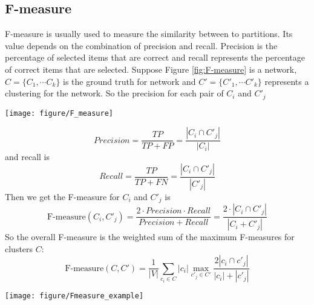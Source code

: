 \documentclass[12pt,oneside,final]{vlsithesis}
\begin{document}
\subsection{F-measure}
F-measure \cite{wagner2007comparing} is usually used to measure the similarity between to partitions. Its value depends on the combination of precision and recall. Precision is the percentage of selected items that are correct and recall represents the percentage of correct items that are selected. Suppose Figure \ref{fig:F-measure} is a network, $C = \{C_{1}, \cdots C_{k}\}$ is the ground truth for network and $C' = \{C'_{1}, \cdots C'_{k}\}$ represents a clustering for the network. So the precision for each pair of $C_{i}$ and $C'_{j}$ 
\begin{figure*}
	\centering
	\texttt{[image: figure/F\_measure]}
	\caption{F-measure}
	\label{fig:F-measure}
\end{figure*}
\begin{equation}
	Precision = \frac{TP}{TP + FP} = \frac{|C_{i} \cap C'_{j}|}{|C_{i}|}
\end{equation}
and recall is 
\begin{equation}
	Recall = \frac{TP}{TP + FN} = \frac{|C_{i} \cap C'_{j}|}{|C'_{j}|}
\end{equation}
Then we get the F-measure for $C_{i}$ and $C'_{j}$ is
\begin{equation}
	\mbox{F-measure}(C_{i}, C'_{j}) = \dfrac{2 \cdot Precision \cdot Recall}{Precision + Recall} = \dfrac{2 \cdot |C_{i} \cap C'_{j}|}{|C_{i} + C'_{j}|}
	\label{equ:F-measure}
\end{equation}
So the overall F-measure is the weighted sum of the maximum F-measures for clusters $C$:
\begin{equation}
\mbox{F-measure}(C,C') = \frac{1}{|V|}\sum_{c_{i}\in C}|c_{i}|\max_{c'_{j}\in C'}\frac{2|c_{i}\cap c'_{j}|}{|c_{i}|+|c'_{j}|} 
\end{equation}
\begin{figure*}
	\centering
	\texttt{[image: figure/Fmeasure\_example]}
	\caption{Example of F-measure}
	\label{fig:F-measure example}
\end{figure*}
\end{document}
